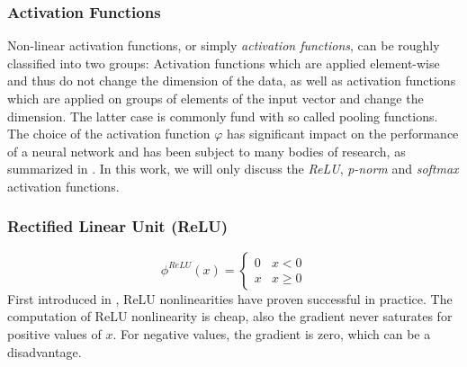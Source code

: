 \subsubsection{Activation Functions}

Non-linear activation functions, or simply \textit{activation functions}, can be roughly classified into two groups: Activation functions which are applied element-wise and thus do not change the dimension of the data, as well as activation functions which are applied on groups of elements of the input vector and change the dimension. The latter case is commonly fund with so called pooling functions. The choice of the activation function $\varphi$ has significant impact on the performance of a neural network and has been subject to many bodies of research, as summarized in \cite{thoma2017analysis}. In this work, we will only discuss the \textit{ReLU}, \textit{p-norm} and \textit{softmax} activation functions. 

\subsubsection*{Rectified Linear Unit (ReLU)}
\begin{minipage}{0.45\textwidth}
	\[\phi^{ReLU}(x) = \begin{cases}
	0 & x < 0 \\
	x & x \geq 0
	\end{cases}\]
	First introduced in \cite{krizhevsky2012imagenet}, ReLU nonlinearities have proven successful in practice. The computation of ReLU nonlinearity is cheap, also the gradient never saturates for positive values of $x$. For negative values, the gradient is zero, which can be a disadvantage.  
\end{minipage}
\hfill
\begin{minipage}{0.45\textwidth}
\end{minipage}

